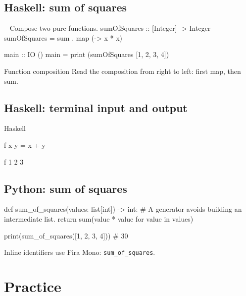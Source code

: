 \documentclass[\BayMode]{baybeamer}
\begin{document}
\subsection{Haskell: sum of squares}
\begin{frame}[fragile]
\begin{haskell}
-- Compose two pure functions.
sumOfSquares :: [Integer] -> Integer
sumOfSquares = sum . map (\x -> x * x)

main :: IO ()
main = print (sumOfSquares [1, 2, 3, 4])
\end{haskell}
  \begin{hintbox}{Function composition}
    Read the composition from right to left: first map, then sum.
  \end{hintbox}
\end{frame}

\subsection{Haskell: terminal input and output}
\begin{frame}[fragile]
\begin{codebox}{Haskell}
\begin{plainhaskell}
f x y = x + y
\end{plainhaskell}
\begin{terminal}
f 1 2
3
\end{terminal}
\end{codebox}
\end{frame}

\subsection{Python: sum of squares}
\begin{frame}[fragile]
\begin{python}
def sum_of_squares(values: list[int]) -> int:
    # A generator avoids building an intermediate list.
    return sum(value * value for value in values)

print(sum_of_squares([1, 2, 3, 4]))  # 30
\end{python}
Inline identifiers use Fira Mono: \texttt{sum\_of\_squares}.
\end{frame}

\section{Practice}
\end{document}
